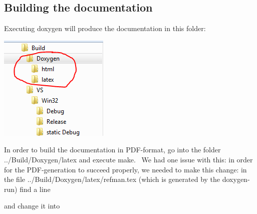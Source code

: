 \subsection*{Building the documentation }

Executing {\ttfamily doxygen} will produce the documentation in this folder\+:


\begin{DoxyImage}
\includegraphics[width=\textwidth,height=\textheight/2,keepaspectratio=true]{doxygen_1.PNG}
\end{DoxyImage}
 In order to build the documentation in P\+D\+F-\/format, go into the folder ../\+Build/\+Doxygen/latex and execute {\ttfamily make}.~\newline
We had one issue with this\+: in order for the P\+D\+F-\/generation to succeed properly, we needed to make this change\+: in the file ../\+Build/\+Doxygen/latex/refman.tex (which is generated by the doxygen-\/run) find a line \begin{DoxyVerb}\usepackage[utf8]{inputenc}
\end{DoxyVerb}


and change it into \begin{DoxyVerb}\usepackage[utf8x]{inputenc}
\end{DoxyVerb}



